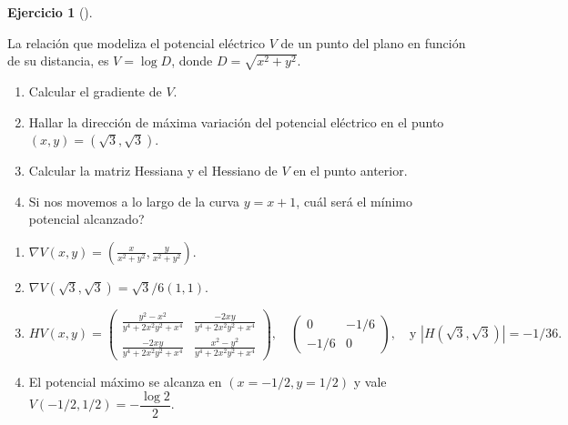\documentclass[
  a4paper,
]{scrreport}
\theoremstyle{definition}
\newtheorem{exercise}{Ejercicio}[chapter]
\theoremstyle{remark}
\begin{document}
\begin{exercise}[]\protect\hypertarget{exr-potencial-electrico}{}\label{exr-potencial-electrico}

La relación que modeliza el potencial eléctrico \(V\) de un punto del
plano en función de su distancia, es \(V=\log D\), donde
\(D=\sqrt{x^2+y^2}\).

\begin{enumerate}
\def\labelenumi{\alph{enumi}.}
\item
  Calcular el gradiente de \(V\).
\item
  Hallar la dirección de máxima variación del potencial eléctrico en el
  punto \((x,y)=(\sqrt{3},\sqrt{3})\).
\item
  Calcular la matriz Hessiana y el Hessiano de \(V\) en el punto
  anterior.
\item
  Si nos movemos a lo largo de la curva \(y=x+1\), cuál será el mínimo
  potencial alcanzado?
\end{enumerate}

\end{exercise}

\begin{tcolorbox}[enhanced jigsaw, bottomrule=.15mm, breakable, colframe=quarto-callout-tip-color-frame, toprule=.15mm, opacityback=0, left=2mm, opacitybacktitle=0.6, colback=white, toptitle=1mm, titlerule=0mm, bottomtitle=1mm, arc=.35mm, title=\textcolor{quarto-callout-tip-color}{\faLightbulb}\hspace{0.5em}{Solución}, rightrule=.15mm, colbacktitle=quarto-callout-tip-color!10!white, leftrule=.75mm, coltitle=black]

\begin{enumerate}
\def\labelenumi{\alph{enumi}.}
\item
  \(\nabla V(x,y) = \left( \frac{x}{x^2+y^2},\frac{y}{x^2+y^2}\right)\).

  \item

  \(\nabla V(\sqrt 3, \sqrt 3) = \sqrt 3 /6(1,1)\).
\item
  \[
  HV(x,y) = \left(
  \begin{array}{cc}
  \frac{y^2-x^2}{y^4+2x^2y^2+x^4} & \frac{-2xy}{y^4+2x^2y^2+x^4} \\
  \frac{-2xy}{y^4+2x^2y^2+x^4} & \frac{x^2-y^2}{y^4+2x^2y^2+x^4}
  \end{array}
  \right),\quad
  \left(
  \begin{array}{cc}
  0 & -1/6 \\
  -1/6 & 0
  \end{array}
  \right),\quad \mbox{y }
  |H(\sqrt 3,\sqrt 3)| = -1/36.
  \]
\item
  El potencial máximo se alcanza en \((x=-1/2, y=1/2)\) y vale
  \(V(-1/2,1/2) = -\dfrac{\log 2}{2}\).
\end{enumerate}

\end{tcolorbox}
\end{document}

